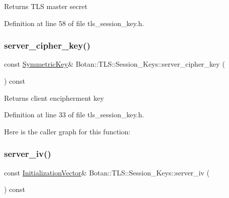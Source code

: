 \begin{DoxyReturn}{Returns}
T\+LS master secret 
\end{DoxyReturn}


Definition at line 58 of file tls\+\_\+session\+\_\+key.\+h.

\mbox{\label{class_botan_1_1_t_l_s_1_1_session___keys_a53aedead940ee203e7480a80c08318c9}} 
\subsubsection{\texorpdfstring{server\+\_\+cipher\+\_\+key()}{server\_cipher\_key()}}
{\footnotesize\ttfamily const \mbox{\hyperlink{namespace_botan_a89cf6c3513428f524454d01830221a88}{Symmetric\+Key}}\& Botan\+::\+T\+L\+S\+::\+Session\+\_\+\+Keys\+::server\+\_\+cipher\+\_\+key (\begin{DoxyParamCaption}{ }\end{DoxyParamCaption}) const\hspace{0.3cm}{\ttfamily [inline]}}

\begin{DoxyReturn}{Returns}
client encipherment key 
\end{DoxyReturn}


Definition at line 33 of file tls\+\_\+session\+\_\+key.\+h.

Here is the caller graph for this function\+:
\mbox{\label{class_botan_1_1_t_l_s_1_1_session___keys_a3b0a61516654fbd61723568f2ed5bdec}} 
\subsubsection{\texorpdfstring{server\+\_\+iv()}{server\_iv()}}
{\footnotesize\ttfamily const \mbox{\hyperlink{namespace_botan_a2fbf5195ffe701adcabb1f8c41bfc557}{Initialization\+Vector}}\& Botan\+::\+T\+L\+S\+::\+Session\+\_\+\+Keys\+::server\+\_\+iv (\begin{DoxyParamCaption}{ }\end{DoxyParamCaption}) const\hspace{0.3cm}{\ttfamily [inline]}}

